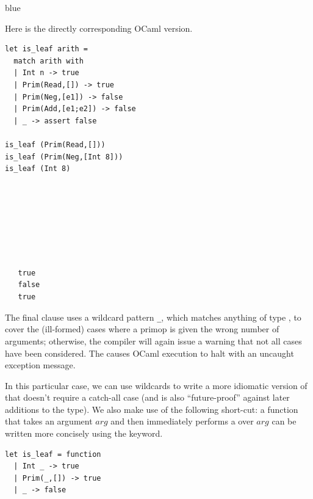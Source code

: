 \documentclass[11pt]{book}
\newenvironment{ocamlx}{
  \begin{color}{blue}
}
{
  \end{color}
}
\begin{document}
\begin{ocamlx}
Here is the directly corresponding OCaml version.
\begin{center}
\begin{minipage}{0.6\textwidth}
\begin{lstlisting}[style=ocaml]
let is_leaf arith = 
  match arith with
  | Int n -> true
  | Prim(Read,[]) -> true
  | Prim(Neg,[e1]) -> false
  | Prim(Add,[e1;e2]) -> false
  | _ -> assert false
  
is_leaf (Prim(Read,[]))
is_leaf (Prim(Neg,[Int 8]))
is_leaf (Int 8)
\end{lstlisting}
\end{minipage}
\vrule
\begin{minipage}{0.25\textwidth}
  \begin{lstlisting}[style=ocaml]




    
    
    
   true
   false
   true
\end{lstlisting}
\end{minipage}
\end{center}

The final clause uses a wildcard pattern {\tt \_}, which matches anything of type ,
to cover the (ill-formed) cases where a primop is given the wrong number of arguments;
otherwise, the compiler will again issue a warning that not all cases have been considered.
The  causes OCaml execution to halt with an uncaught exception message.

In this particular case, we can use wildcards to write a more idiomatic version of
 that doesn't require a catch-all case (and is also ``future-proof''
against later additions to the  type). We also make use of the following
short-cut: a function that takes an argument $arg$ and then immediately performs
a  over $arg$ can be written more concisely using the  keyword.

\begin{center}
\begin{minipage}{0.5\textwidth}
\begin{lstlisting}[style=ocaml]
let is_leaf = function 
  | Int _ -> true
  | Prim(_,[]) -> true
  | _ -> false
\end{lstlisting}
\end{minipage}
\end{center}
\end{ocamlx}
\end{document}
